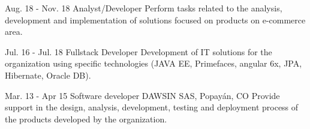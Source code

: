\documentclass[american]{cv-class}
\begin{document}
\begin{entrylist}
	\entry
	{Aug. 18 - Nov. 18}
	{Analyst/Developer}
	{ }
	{Perform tasks related to the analysis, development and implementation of solutions focused on products on e-commerce area.}
	
	\entry
	{Jul. 16 - Jul. 18}
	{Fullstack Developer}
	{ }
	{Development of IT solutions for the organization using specific technologies (JAVA EE, Primefaces, angular 6x, JPA, Hibernate, Oracle DB).}
	
	\entry
	{Mar. 13 - Apr 15}
	{Software developer}
	{DAWSIN SAS, Popayán, CO}
	{Provide support in the design, analysis, development, testing and deployment process of the products developed by the organization.}
\end{entrylist}
\end{document}
